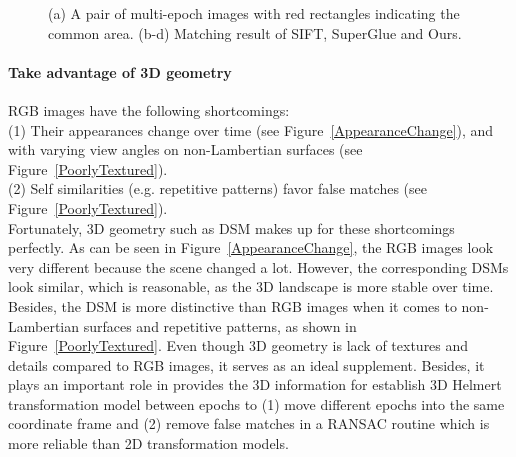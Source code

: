 \begin{figure}[htbp]
\begin{center}
{\begin{minipage}[t]{0.45\linewidth}
	\end{minipage}%
}
		\caption{(a) A pair of multi-epoch images with red rectangles indicating the common area. (b-d) Matching result of SIFT, SuperGlue and Ours.}
		\label{MultiEpochImgPair}
	\end{center}
\end{figure}

\paragraph{Take advantage of 3D geometry}
RGB images have the following shortcomings:\\
(1) Their appearances change over time (see Figure~\ref{AppearanceChange}), and with varying view angles on non-Lambertian surfaces (see Figure~\ref{PoorlyTextured}).\\
(2) Self similarities (e.g. repetitive patterns) favor false matches (see Figure~\ref{PoorlyTextured}).\\
Fortunately, 3D geometry such as DSM makes up for these shortcomings perfectly. As can be seen in Figure~\ref{AppearanceChange}, the RGB images look very different because the scene changed a lot. However, the corresponding DSMs look similar, which is reasonable, as the 3D landscape is more stable over time. Besides, the DSM is more distinctive than RGB images when it comes to non-Lambertian surfaces and repetitive patterns, as shown in Figure~\ref{PoorlyTextured}. 
Even though 3D geometry is lack of textures and details compared to RGB images, it serves as an ideal supplement. Besides, it plays an important role in provides the 3D information for establish 3D Helmert transformation model between epochs to (1) move different epochs into the same coordinate frame and (2) remove false matches in a RANSAC routine which is more reliable than 2D transformation models.

